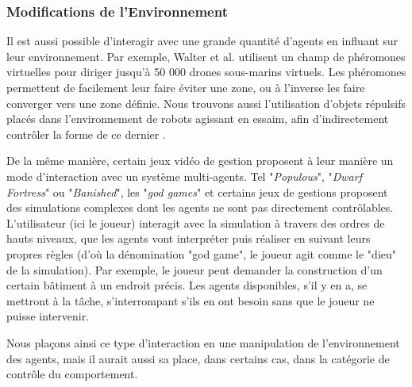 		
		
	\subsubsection{Modifications de l'Environnement}
		Il est aussi possible d'interagir avec une grande quantité d'agents en influant sur leur environnement. Par exemple, Walter et al. \cite{walter_uav_2006} utilisent un champ de phéromones virtuelles pour diriger jusqu'à 50 000 drones sous-marins virtuels. Les phéromones permettent de facilement leur faire éviter une zone, ou à l'inverse les faire converger vers une zone définie. Nous trouvons aussi l'utilisation d'objets répulsifs placés dans l'environnement de robots agissant en essaim, afin d'indirectement contrôler la forme de ce dernier \cite{jung_multi-robot_2013}.	
	
		De la même manière, certain jeux vidéo de gestion proposent à leur manière un mode d'interaction avec un système multi-agents. Tel "\textit{Populous}", "\textit{Dwarf Fortress}" ou "\textit{Banished}", les "\textit{god games}" et certains jeux de gestions proposent des simulations complexes dont les agents ne sont pas directement contrôlables. L'utilisateur (ici le joueur) interagit avec la simulation à travers des ordres de hauts niveaux, que les agents vont interpréter puis réaliser en suivant leurs propres règles (d'où la dénomination "god game", le joueur agit comme le "dieu" de la simulation). Par exemple, le joueur peut demander la construction d'un certain bâtiment à un endroit précis. Les agents disponibles, s'il y en a, se mettront à la tâche, s'interrompant s'ils en ont besoin sans que le joueur ne puisse intervenir. 
		
		Nous plaçons ainsi ce type d'interaction en une manipulation de l'environnement des agents, mais il aurait aussi sa place, dans certains cas, dans la catégorie de contrôle du comportement.
	
